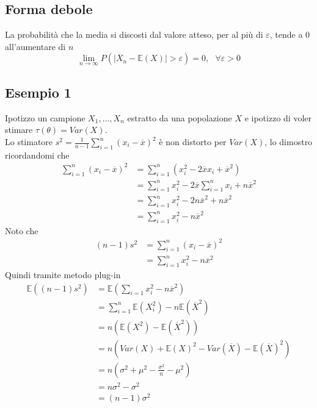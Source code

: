 \documentclass[11pt]{report}
\begin{document}
\subsection{Forma debole}
La probabilità che la media si discosti dal valore atteso, per al più di $\varepsilon$, tende a 0 all'aumentare di $n$
\begin{equation}
	\lim_{n\to\infty} P \left(\mid \overline{X}_n-\mathbb{E}(X) \mid > \varepsilon \right) = 0,\ \ \ \forall\varepsilon > 0
\end{equation}
\subsection{Esempio 1}
Ipotizzo un campione $X_1, \dots, X_n$ estratto da una popolazione $X$ e ipotizzo di voler stimare $\tau(\theta) = Var(X)$.\\
Lo stimatore $s^2 = \frac{1}{n-1} \sum_{i=1}^n (x_i - \overline{x})^2$ è non distorto per $Var(X)$, lo dimostro ricordandomi che
\begin{equation}
    \begin{split}
        \sum_{i=1}^n (x_i - \overline{x})^2 & = \sum_{i=1}^n (x_i^2 - 2\overline{x}x_i + \overline{x}^2)\\
        & = \sum_{i=1}^n x_i^2 - 2\overline{x} \sum_{i=1}^n x_i + n\overline{x}^2\\
        & = \sum_{i=1}^n x_i^2 - 2n\overline{x}^2 + n\overline{x}^2\\
        & = \sum_{i=1}^n x_i^2 -  n\overline{x}^2
    \end{split}
\end{equation}
Noto che
\begin{equation}
	\begin{split}
		(n-1)s^2 & = \sum_{i=1}^n (x_i - \overline{x})^2\\
		& = \sum_{i=1}^n x_i^2 - n\overline{x}^2
	\end{split}
\end{equation}
Quindi tramite metodo plug-in
\begin{equation}
    \begin{split}
        \mathbb{E} \left( (n-1)s^2 \right) & = \mathbb{E} \left( \sum_{i=1} x_i^2 -  n\overline{x}^2 \right)\\
        & = \sum_{i=1}^n \mathbb{E} \left( X_i^2 \right) - n\mathbb{E} \left( \overline{X}^2 \right)\\
        & = n \left( \mathbb{E} \left( X^2 \right) - \mathbb{E} \left( \overline{X}^2 \right) \right)\\
        & = n \left( Var(X) + \mathbb{E}(X)^2 - Var(\overline{X}) - \mathbb{E}(\overline{X})^2 \right)\\
        & = n \left( \sigma^2 + \mu^2 - \frac{\sigma^2}{n} - \mu^2 \right)\\
        & = n\sigma^2 - \sigma^2\\
        & = (n-1)\sigma^2
    \end{split}
\end{equation}
\end{document}
